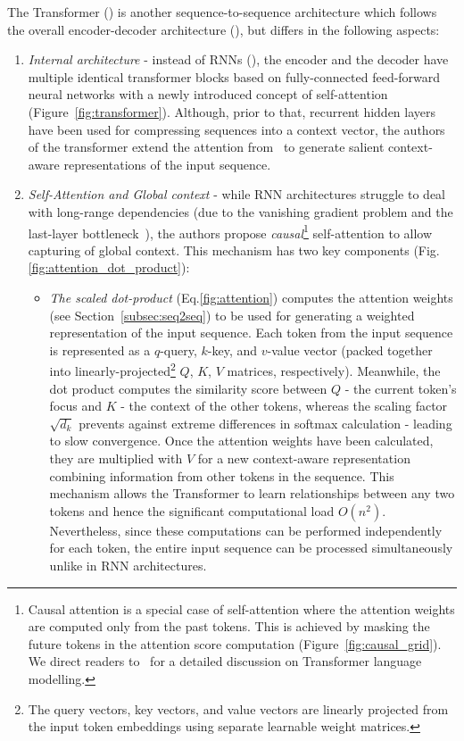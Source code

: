 The Transformer (\cite{vaswani2017attention}) is another sequence-to-sequence architecture which follows the overall encoder-decoder architecture (\cite{sutskever2014sequence}), but differs in the following aspects:
\begin{enumerate}
    \item \emph{Internal architecture} - instead of RNNs (\cite{cho-etal-2014-learning}), the encoder and the decoder have multiple identical transformer blocks based on fully-connected feed-forward neural networks with a newly introduced concept of self-attention (Figure~\ref{fig:transformer}).
    Although, prior to that, recurrent hidden layers have been used for compressing sequences into a context vector, the authors of the transformer extend the attention from~\cite{bahdanau2016neural} to generate salient context-aware representations of the input sequence.
    \item \emph{Self-Attention and Global context} - while RNN architectures struggle to deal with long-range dependencies (due to the vanishing gradient problem and the last-layer bottleneck~\cite{bahdanau2016neural}), the authors propose
    \emph{causal}\footnote{
        Causal attention is a special case of self-attention where the attention weights are computed only from the past tokens.
        This is achieved by masking the future tokens in the attention score computation (Figure~\ref{fig:causal_grid}).
        We direct readers to~\cite{jurafsky2000} for a detailed discussion on Transformer language modelling.
    } self-attention to allow capturing of global context.
    This mechanism has two key components (Fig.\ref{fig:attention_dot_product}):
    \begin{itemize}
        \item \emph{The scaled dot-product} (Eq.\ref{fig:attention}) computes the attention weights (see Section~\ref{subsec:seq2seq}) to be used for generating a weighted representation of the input sequence.
        Each token from the input sequence is represented as a $q$-query, $k$-key, and $v$-value vector (packed together into linearly-projected\footnote{
            The query vectors, key vectors, and value vectors are linearly projected from the input token embeddings using separate learnable weight matrices.
        } $Q$, $K$, $V$ matrices, respectively).
        Meanwhile, the dot product computes the similarity score between $Q$ - the current token's focus and $K$ - the context of the other tokens, whereas the scaling factor $\sqrt{d_{k}}$ prevents against extreme differences in softmax calculation - leading to slow convergence.
        Once the attention weights have been calculated, they are multiplied with $V$ for a new context-aware representation combining information from other tokens in the sequence.
        This mechanism allows the Transformer to learn relationships between any two tokens and hence the significant computational load $O(n^2)$.
        Nevertheless, since these computations can be performed independently for each token, the entire input sequence can be processed simultaneously unlike in RNN architectures.


\end{itemize}
\end{enumerate}
